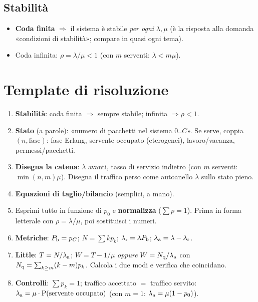 \subsection{Stabilità}
\begin{itemize}
\item \textbf{Coda finita} $\Rightarrow$ il sistema è stabile \emph{per ogni} $\lambda,\mu$ (è la risposta alla domanda «condizioni di stabilità»; compare in quasi ogni tema).
\item Coda infinita: $\rho=\lambda/\mu<1$ (con $m$ serventi: $\lambda<m\mu$).
\end{itemize}

\section{Template di risoluzione}\label{sec:template}

\begin{procedura}
\begin{enumerate}[leftmargin=*]
\item \textbf{Stabilità}: coda finita $\Rightarrow$ sempre stabile; infinita $\Rightarrow\rho<1$.
\item \textbf{Stato} (a parole): «numero di pacchetti nel sistema $0..C$». Se serve, coppia $(n,\text{fase})$: fase Erlang, servente occupato (eterogenei), lavoro/vacanza, permessi/pacchetti.
\item \textbf{Disegna la catena}: $\lambda$ avanti, tasso di servizio indietro (con $m$ serventi: $\min(n,m)\mu$). Disegna il traffico perso come autoanello $\lambda$ sullo stato pieno.
\item \textbf{Equazioni di taglio/bilancio} (semplici, a mano).
\item Esprimi tutto in funzione di $p_0$ e \textbf{normalizza} ($\sum p=1$). Prima in forma letterale con $\rho=\lambda/\mu$, poi sostituisci i numeri.
\item \textbf{Metriche}: $P_{\mathrm{b}}=p_C$; $N=\sum kp_k$; $\lambda_{\mathrm{r}}=\lambda P_{\mathrm{b}}$; $\lambda_{\mathrm{a}}=\lambda-\lambda_{\mathrm{r}}$.
\item \textbf{Little}: $T=N/\lambda_{\mathrm{a}}$; $W=T-1/\mu$ \emph{oppure} $W=N_{\mathrm{q}}/\lambda_{\mathrm{a}}$ con $N_{\mathrm{q}}=\sum_{k\ge m}(k-m)p_k$. Calcola i due modi e verifica che coincidano.
\item \textbf{Controlli}: $\sum p_k=1$; traffico accettato $=$ traffico servito: $\lambda_{\mathrm{a}}=\mu\cdot\mathrm{P}(\text{servente occupato})$ (con $m=1$: $\lambda_{\mathrm{a}}=\mu(1-p_0)$).
\end{enumerate}
\end{procedura}

